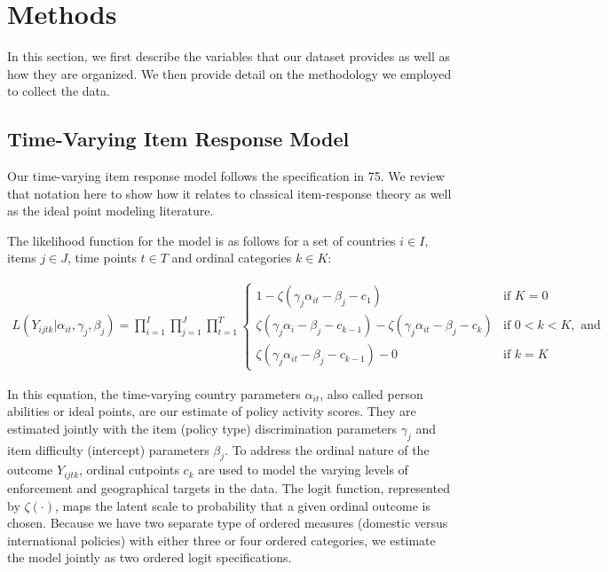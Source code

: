 \documentclass[]{article}
\begin{document}
\hypertarget{methods}{%
\section*{Methods}\label{methods}}

In this section, we first describe the variables that our dataset provides as well as how they are organized. We then provide detail on the methodology we employed to collect the data.

\hypertarget{time-varying-item-response-model}{%
\subsection*{Time-Varying Item Response Model}\label{time-varying-item-response-model}}

Our time-varying item response model follows the specification in 75. We review that notation here to show how it relates to classical item-response theory as well as the ideal point modeling literature.

The likelihood function for the model is as follows for a set of countries \(i \in I\), items \(j \in J\), time points \(t \in T\) and ordinal categories \(k \in K\):

\begin{align}
    L(Y_{ijtk}|\alpha_{it},\gamma_j,\beta_j) =  \prod_{i=1}^{I} \prod_{j=1}^{J} \prod_{t=1}^{T}
    \begin{cases} 
    1 -  \zeta(\gamma_j \alpha_{it} - \beta_j - c_1) & \text{if } K = 0 \\
    \zeta(\gamma_j \alpha_i - \beta_j - c_{k-1}) - \zeta(\gamma_j \alpha_{it} - \beta_j - c_{k})       & \text{if } 0 < k < K, \text{ and} \\
    \zeta(\gamma_j \alpha_{it} - \beta_j - c_{k-1}) - 0 & \text{if } k=K
    \end{cases}
\label{eq:basic}
\end{align}

In this equation, the time-varying country parameters \(\alpha_{it}\), also called person abilities or ideal points, are our estimate of policy activity scores. They are estimated jointly with the item (policy type) discrimination parameters \(\gamma_j\) and item difficulty (intercept) parameters \(\beta_j\). To address the ordinal nature of the outcome \(Y_{ijtk}\), ordinal cutpoints \(c_{k}\) are used to model the varying levels of enforcement and geographical targets in the data. The logit function, represented by \(\zeta(\cdot)\), maps the latent scale to probability that a given ordinal outcome is chosen. Because we have two separate type of ordered measures (domestic versus international policies) with either three or four ordered categories, we estimate the model jointly as two ordered logit specifications.
\end{document}
